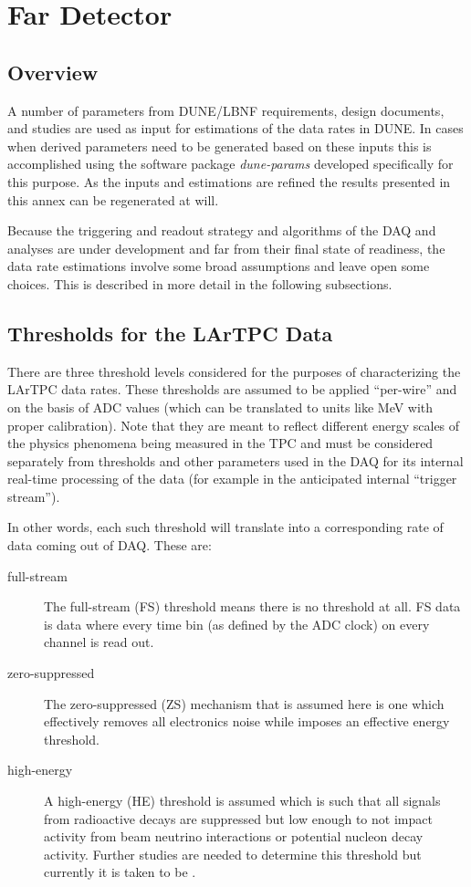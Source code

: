 \chapter{Far Detector}
\label{ch:annex-rate}

\section{Overview}

A number of parameters from DUNE/LBNF requirements, design documents,  and studies are used  as input
for estimations of the data rates in DUNE. In cases when derived parameters need to be generated based on these inputs
this is accomplished using the software package \textit{dune-params}\cite{duneparams}
developed specifically for this purpose.
As the inputs and estimations are refined the results presented in
this annex can be regenerated at will.

Because the triggering and readout strategy and algorithms of the DAQ and
analyses are under development and far from their final state of readiness,
the data rate estimations involve some broad assumptions and leave open some choices.
This is described in more detail in the following subsections.



\section{Thresholds for the LArTPC Data}

There are three threshold levels considered for the purposes of characterizing the LArTPC data rates.
These thresholds are assumed to be applied ``per-wire'' and on the basis of ADC values (which can be translated
to units like MeV with proper calibration).
Note that they are meant to reflect different energy scales of the physics phenomena being
measured in the TPC and  must be considered separately from thresholds and other parameters used  in the
DAQ for its internal real-time processing of the data (for example in the anticipated internal ``trigger stream'').

In other words, each such threshold will translate into a corresponding rate of data coming out of DAQ. These are:

\begin{description}
\item[full-stream] The full-stream (FS) threshold means there is no threshold at all.
FS data is data where every time bin (as defined by the ADC clock) on every channel is read out.
\item[zero-suppressed] The zero-suppressed (ZS) mechanism that is
  assumed here is one which effectively removes all electronics noise
  while imposes an effective \chargezsthreshold energy threshold.
\item[high-energy] A high-energy (HE) threshold is assumed which is
  such that all signals from radioactive decays are suppressed but low
  enough to not impact activity from beam neutrino interactions or
  potential nucleon decay activity.
  Further studies are needed to determine this threshold but currently it is taken to be
  \chargehethreshold.
\end{description}

